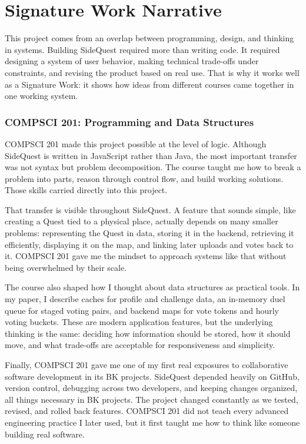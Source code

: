 \documentclass[12pt,a4paper,oneside]{report}
\begin{document}
\clearpage

\chapter*{Signature Work Narrative}


This project comes from an overlap between programming, design, and thinking in systems. Building SideQuest required more than writing code. It required designing a system of user behavior, making technical trade-offs under constraints, and revising the product based on real use. That is why it works well as a Signature Work: it shows how ideas from different courses came together in one working system.

\subsection*{COMPSCI 201: Programming and Data Structures}

COMPSCI 201 made this project possible at the level of logic. Although SideQuest is written in JavaScript rather than Java, the most important transfer was not syntax but problem decomposition. The course taught me how to break a problem into parts, reason through control flow, and build working solutions. Those skills carried directly into this project.

That transfer is visible throughout SideQuest. A feature that sounds simple, like creating a Quest tied to a physical place, actually depends on many smaller problems: representing the Quest in data, storing it in the backend, retrieving it efficiently, displaying it on the map, and linking later uploads and votes back to it. COMPSCI 201 gave me the mindset to approach systems like that without being overwhelmed by their scale.

The course also shaped how I thought about data structures as practical tools. In my paper, I describe caches for profile and challenge data, an in-memory duel queue for staged voting pairs, and backend maps for vote tokens and hourly voting buckets. These are modern application features, but the underlying thinking is the same: deciding how information should be stored, how it should move, and what trade-offs are acceptable for responsiveness and simplicity.

Finally, COMPSCI 201 gave me one of my first real exposures to collaborative software development in its BK projects. SideQuest depended heavily on GitHub, version control, debugging across two developers, and keeping changes organized, all things necessary in BK projects. The project changed constantly as we tested, revised, and rolled back features. COMPSCI 201 did not teach every advanced engineering practice I later used, but it first taught me how to think like someone building real software.
\end{document}
